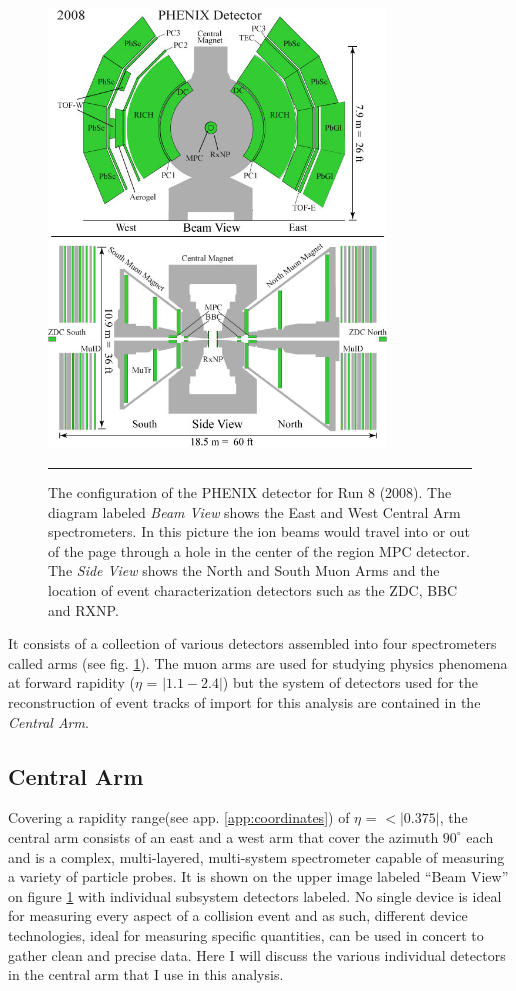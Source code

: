 \begin{figure}[htbp]
  \centering
    \includegraphics[width=0.8\textwidth]{Figures/Phenix_2008.jpg}
    \rule{35em}{0.5pt}
  \caption[PHENIX Detector Configuration for RHIC Run 8 (2008)]{The configuration of the PHENIX detector for Run 8 (2008). The diagram labeled \textit{Beam View} shows the East and West Central Arm spectrometers. In this picture the ion beams would travel into or out of the page through a hole in the center of the region MPC detector. The \textit{Side View} shows the North and South Muon Arms and the location of event characterization detectors such as the ZDC, BBC and RXNP.}
  \label{fig:run8config}
\end{figure}
It consists of a collection of various detectors assembled into four spectrometers called arms (see fig. \ref{fig:run8config}). The muon arms are used for studying physics phenomena at forward rapidity ($\eta$ = $|1.1-2.4|$)\citep{rapidityref} but the system of detectors used for the reconstruction of event tracks of import for this analysis are contained in the \textit{Central Arm}.  

\subsection{Central Arm}
Covering a rapidity range(see app. \ref{app:coordinates}) of $\eta$ = $<|0.375|$, the central arm consists of an east and a west arm that cover the azimuth $90^{\circ}$ each \citep{EMCfocus}and is a complex, multi-layered, multi-system spectrometer capable of measuring a variety of particle probes. It is shown on the upper image labeled ``Beam View'' on figure \ref{fig:run8config} with individual subsystem detectors labeled. No single device is ideal for measuring every aspect of a collision event and as such, different device technologies, ideal for measuring specific quantities, can be used in concert to gather clean and precise data. Here I will discuss the various individual detectors in the central arm that I use in this analysis.


